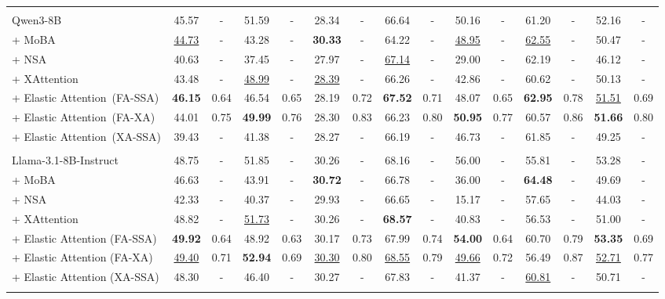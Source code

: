 \begin{table}[t]
{\begin{tabular}{l | cc | cc | cc | cc | cc | cc | cc}
\arrayrulecolor{black}\midrule
\rowcolor{blue!25}
\multicolumn{15}{c}{\textbf{Qwen3-8B 骨干模型}} \\
\arrayrulecolor{black!20}\midrule
Qwen3-8B & 45.57 & - & 51.59 & - & 28.34 & - & 66.64 & - & 50.16 & - & 61.20 & - & 52.16 & - \\
+ MoBA & \underline{44.73} & - & 43.28 & - & \bf 30.33 & - & 64.22 & - & \underline{48.95} & - & \underline{62.55} & - & 50.47 & - \\
+ NSA & 40.63 & - & 37.45 & - & 27.97 & - & \underline{67.14} & - & 29.00 & - & 62.19 & - & 46.12 & - \\
+ XAttention & 43.48 & - & \underline{48.99} & - & \underline{28.39} & - & 66.26 & - & 42.86 & - & 60.62 & - & 50.13 & - \\
\arrayrulecolor{black!40}\midrule
+ Elastic Attention~(FA-SSA)& \bf 46.15 & 0.64 & 46.54 & 0.65 & 28.19 & 0.72 & \bf 67.52 & 0.71 & 48.07 & 0.65 & \bf 62.95 & 0.78 & \underline{51.51} & 0.69 \\
+ Elastic Attention~(FA-XA)& 44.01 & 0.75 & \bf 49.99 & 0.76 & 28.30 & 0.83 & 66.23 & 0.80 & \bf 50.95 & 0.77 & 60.57 & 0.86 & \bf 51.66 & 0.80 \\
+ Elastic Attention~(XA-SSA) & 39.43 & - & 41.38 & - & 28.27 & - & 66.19 & - & 46.73 & - & 61.85 & - & 49.25 & - \\

\arrayrulecolor{black}\midrule
\rowcolor{cyan!20}
\multicolumn{15}{c}{\textbf{Llama-3.1-8B-Instruct 骨干模型}} \\
\arrayrulecolor{black!20}\midrule
Llama-3.1-8B-Instruct & 48.75 & - & 51.85 & - & 30.26 & - & 68.16 & - & 56.00 & - & 55.81 & - & 53.28 & - \\
+ MoBA & 46.63 & - & 43.91 & - & \bf 30.72 & - & 66.78 & - & 36.00 & - & \bf 64.48 & - & 49.69 & - \\
+ NSA & 42.33 & - & 40.37 & - & 29.93 & - & 66.65 & - & 15.17 & - & 57.65 & - & 44.03 & - \\
+ XAttention & 48.82 & - & \underline{51.73} & - & 30.26 & - & \bf 68.57 & - & 40.83 & - & 56.53 & - & 51.00 & - \\
\arrayrulecolor{black!40}\midrule
+ Elastic Attention (FA-SSA) & \textbf{49.92} & 0.64 & 48.92 & 0.63 & 30.17 & 0.73 & 67.99 & 0.74 & \bf 54.00 & 0.64 & 60.70 & 0.79 & \bf 53.35 & 0.69 \\
+ Elastic Attention (FA-XA) & \underline{49.40} & 0.71 & \bf 52.94 & 0.69 & \underline{30.30} & 0.80 & \underline{68.55} & 0.79 & \underline{49.66} & 0.72 & 56.49 & 0.87 & \underline{52.71} & 0.77 \\
+ Elastic Attention (XA-SSA) & 48.30 & - & 46.40 & - & 30.27 & - & 67.83 & - & 41.37 & - & \underline{60.81} & - & 50.71 & - \\

\arrayrulecolor{black}\bottomrule
\end{tabular}
}
\label{tab:longbench_appendix}
\vspace{-0.5em}
\end{table}
